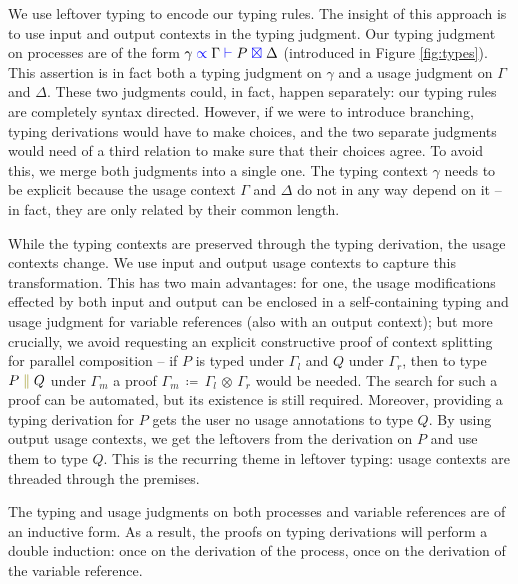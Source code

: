 \documentclass[a4paper,UKenglish,cleveref, autoref, thm-restate,authorcolumns]{lipics-v2019}
\theoremstyle{definition}
\newcommand{\type}[1]{\textcolor{blue}{\operatorname{#1}}}
\newcommand{\constr}[1]{\textcolor{olive}{\operatorname{#1}}}
\newcommand{\comp}[2]{#1 \; \constr{\parallel} \; #2}
\newcommand{\opctx}[3]{#1 \, \coloneqq \, #2 \, \otimes \, #3}
\newcommand{\types}[4]{#1 \; \type{\propto} \; #2 \; \type{\vdash} \; #3 \; \type{\boxtimes} \; #4}
\begin{document}
We use leftover typing \cite{} to encode our typing rules.
The insight of this approach is to use input and output contexts in the typing judgment.
Our typing judgment on processes are of the form $\types{\gamma}{\Gamma}{P}{\Delta}$ (introduced in Figure \ref{fig:types}).
This assertion is in fact both a typing judgment on $\gamma$ and a usage judgment on $\Gamma$ and $\Delta$.
These two judgments could, in fact, happen separately: our typing rules are completely syntax directed.
However, if we were to introduce branching, typing derivations would have to make choices, and the two separate judgments would need of a third relation to make sure that their choices agree.
To avoid this, we merge both judgments into a single one.
The typing context $\gamma$ needs to be explicit because the usage context $\Gamma$ and $\Delta$ do not in any way depend on it -- in fact, they are only related by their common length.

While the typing contexts are preserved through the typing derivation, the usage contexts change.
We use input and output usage contexts to capture this transformation.
This has two main advantages: for one, the usage modifications effected by both input and output can be enclosed in a self-containing typing and usage judgment for variable references (also with an output context); but more crucially, we avoid requesting an explicit constructive proof of context splitting for parallel composition -- if $P$ is typed under $\Gamma_l$ and $Q$ under $\Gamma_r$, then to type $\comp{P}{Q}$ under $\Gamma_m$ a proof $\opctx{\Gamma_m}{\Gamma_l}{\Gamma_r}$ would be needed.
The search for such a proof can be automated, but its existence is still required.
Moreover, providing a typing derivation for $P$ gets the user no usage annotations to type $Q$.
By using output usage contexts, we get the leftovers from the derivation on $P$ and use them to type $Q$.
This is the recurring theme in leftover typing: usage contexts are threaded through the premises.

The typing and usage judgments on both processes and variable references are of an inductive form.
As a result, the proofs on typing derivations will perform a double induction: once on the derivation of the process, once on the derivation of the variable reference.
\end{document}
